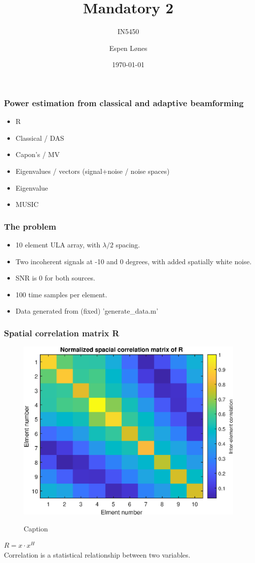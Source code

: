 \documentclass{beamer}
\begin{document}
\title{Mandatory 2}
\subtitle{IN5450}
\author{Espen Lønes}
\institute{}
\date{\today}

\begin{frame}
	\titlepage
\end{frame}

\begin{frame}
	\frametitle{Power estimation from classical and adaptive beamforming}
    \begin{itemize}
    \item R
    \item Classical / DAS
    \item Capon's / MV
    \item Eigenvalues / vectors (signal+noise / noise spaces)
    \item Eigenvalue
    \item MUSIC
    \end{itemize}
\end{frame}

\begin{frame}
	\frametitle{The problem}
	\begin{itemize}
		\item 10 element ULA array, with $\lambda / 2$ spacing.
		\item Two incoherent signals at -10 and 0 degrees, with added spatially white noise.
		\item SNR is 0 for both sources.
		\item 100 time samples per element.
		\item Data generated from (fixed) 'generate\_data.m'
	\end{itemize}
\end{frame}

\begin{frame}
	\frametitle{Spatial correlation matrix R}
	\begin{figure}
		\centering
    	\includegraphics[scale=0.4]{R.eps}\\
    	\caption{Caption}	
	\end{figure}
    $R = x \cdot x^H$\\
    Correlation is a statistical relationship between two variables.\\
\end{frame}
\end{document}
